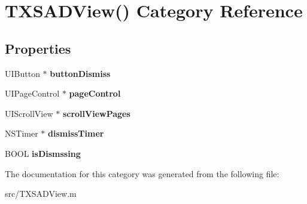 \hypertarget{category_t_x_s_a_d_view_07_08}{}\section{T\+X\+S\+A\+D\+View() Category Reference}
\label{category_t_x_s_a_d_view_07_08}
\subsection*{Properties}
\begin{DoxyCompactItemize}
\item 
\hypertarget{category_t_x_s_a_d_view_07_08_a27442cf62614d18803ad4f698f983204}{}U\+I\+Button $\ast$ {\bfseries button\+Dismiss}\label{category_t_x_s_a_d_view_07_08_a27442cf62614d18803ad4f698f983204}

\item 
\hypertarget{category_t_x_s_a_d_view_07_08_aa9b46081a38b71c31f888c067cc1ca19}{}U\+I\+Page\+Control $\ast$ {\bfseries page\+Control}\label{category_t_x_s_a_d_view_07_08_aa9b46081a38b71c31f888c067cc1ca19}

\item 
\hypertarget{category_t_x_s_a_d_view_07_08_a9adaa28ae6d41b035cfbdd6425291f8a}{}U\+I\+Scroll\+View $\ast$ {\bfseries scroll\+View\+Pages}\label{category_t_x_s_a_d_view_07_08_a9adaa28ae6d41b035cfbdd6425291f8a}

\item 
\hypertarget{category_t_x_s_a_d_view_07_08_ac4405e268289b4e614f0d24a9f83862f}{}N\+S\+Timer $\ast$ {\bfseries dismiss\+Timer}\label{category_t_x_s_a_d_view_07_08_ac4405e268289b4e614f0d24a9f83862f}

\item 
\hypertarget{category_t_x_s_a_d_view_07_08_ae92f8df170125b5d9eb94d131999177a}{}B\+O\+O\+L {\bfseries is\+Dismssing}\label{category_t_x_s_a_d_view_07_08_ae92f8df170125b5d9eb94d131999177a}

\end{DoxyCompactItemize}


The documentation for this category was generated from the following file\+:\begin{DoxyCompactItemize}
\item 
src/T\+X\+S\+A\+D\+View.\+m\end{DoxyCompactItemize}

